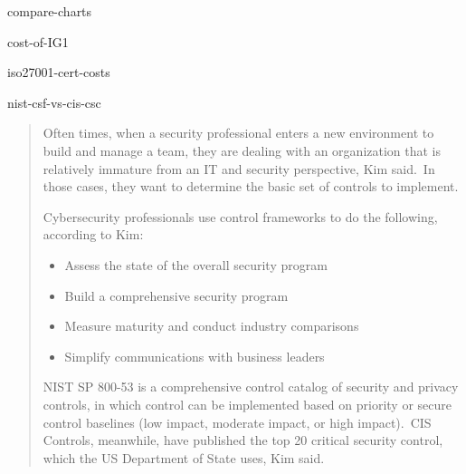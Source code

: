 \documentclass[12pt]{article}
\begin{document}
                                        {compare-charts}
                                        
                                        {cost-of-IG1}

                                        {iso27001-cert-costs}
                                        
                                        {nist-csf-vs-cis-csc}
                                        




\begin{formal}
    
\begin{quote} 
\begin{minipage}{\linewidth}
\renewcommand\thempfootnote{\textcolor{orange}{\arabic{footnote}}}

    
Often times, when a security professional enters a new environment to build and manage a team, they are dealing with an organization that is relatively immature from an IT and security perspective, Kim said.\ In those cases, they want to determine the basic set of controls to implement.

\vspace{10pt}

Cybersecurity professionals use control frameworks to do the following, according to Kim:

\vspace{10pt}

                                        \begin{itemize}
                                               \item Assess the state of the overall security program 
                                               \item Build a comprehensive security program 
                                               \item Measure maturity and conduct industry comparisons 
                                               \item Simplify communications with business leaders 
                                        \end{itemize}
\vspace{10pt}

NIST SP 800-53 is a comprehensive control catalog of security and privacy controls, in which control can be implemented based on priority or secure control baselines (low impact, moderate impact, or high impact).\ CIS Controls, meanwhile, have published the top 20 critical security control, which the US Department of State uses, Kim said.\cite{rayome2019}
\vspace{10pt}


\end{minipage}
\end{quote}
\end{formal}
\end{document}
